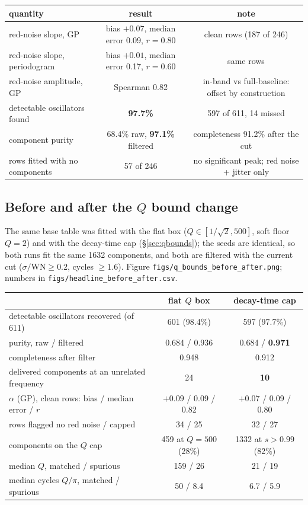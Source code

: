 \documentclass[11pt]{article}
\newcommand{\code}[1]{\texttt{#1}}
\begin{document}
\begin{center}
\begin{tabular}{lcc}
\toprule
quantity & result & note \\
\midrule
red-noise slope, GP            & bias $+0.07$, median error 0.09, $r = 0.80$ & clean rows (187 of 246) \\
red-noise slope, periodogram   & bias $+0.01$, median error 0.17, $r = 0.60$ & same rows \\
red-noise amplitude, GP        & Spearman 0.82 & in-band vs full-baseline: offset by construction \\
detectable oscillators found   & \textbf{97.7\%} & 597 of 611, 14 missed \\
component purity               & 68.4\% raw, \textbf{97.1\%} filtered & completeness 91.2\% after the cut \\
rows fitted with no components & 57 of 246 & no significant peak; red noise + jitter only \\
\bottomrule
\end{tabular}
\end{center}

\subsection{Before and after the $Q$ bound change}

The same base table was fitted with the flat box ($Q \in [1/\sqrt2, 500]$, soft floor
$Q = 2$) and with the decay-time cap (\S\ref{sec:qbounds}); the seeds are identical, so
both runs fit the same 1632 components, and both are filtered with the current cut
($\sigma/\mathrm{WN} \ge 0.2$, cycles $\ge 1.6$). Figure
\code{figs/q\_bounds\_before\_after.png}; numbers in \code{figs/headline\_before\_after.csv}.

\begin{center}
\begin{tabular}{lcc}
\toprule
 & flat $Q$ box & decay-time cap \\
\midrule
detectable oscillators recovered (of 611)   & 601 (98.4\%) & 597 (97.7\%) \\
purity, raw / filtered                      & 0.684 / 0.936 & 0.684 / \textbf{0.971} \\
completeness after filter                   & 0.948 & 0.912 \\
delivered components at an unrelated frequency & 24 & \textbf{10} \\
$\alpha$ (GP), clean rows: bias / median error / $r$ & $+0.09$ / 0.09 / 0.82 & $+0.07$ / 0.09 / 0.80 \\
rows flagged no red noise / capped          & 34 / 25 & 32 / 27 \\
components on the $Q$ cap                   & 459 at $Q = 500$ (28\%) & 1332 at $s > 0.99$ (82\%) \\
median $Q$, matched / spurious              & 159 / 26 & 21 / 19 \\
median cycles $Q/\pi$, matched / spurious   & 50 / 8.4 & 6.7 / 5.9 \\
\bottomrule
\end{tabular}
\end{center}
\end{document}
